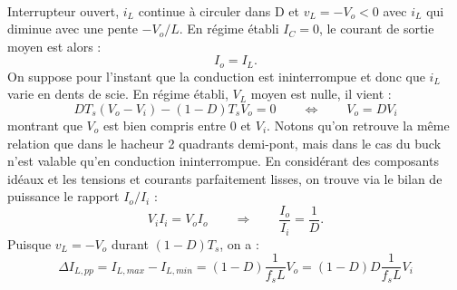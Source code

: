 		\ \\Interrupteur ouvert, $i_L$ continue à circuler dans D et $v_L = -V_o<0$ avec $i_L$  qui diminue avec une pente $-V_o/L$. En régime établi $I_C = 0$, le courant de sortie moyen est alors : 
		\begin{equation}
			I_o = I_L.
		\end{equation}
		On suppose pour l'instant que la conduction est ininterrompue et donc que $i_L$ varie en dents de scie. En régime établi, $V_L$ moyen est nulle, il vient :
		\begin{equation}
			DT_s(V_o-V_i) - (1-D)T_sV_o = 0 \qquad \Leftrightarrow \qquad V_o = DV_i
			\label{eq:5.2}
		\end{equation}
		montrant que $V_o$ est bien compris entre 0 et $V_i$. Notons qu'on retrouve la même relation que dans le hacheur 2 quadrants demi-pont, mais dans le cas du buck n'est valable qu'en conduction ininterrompue. En considérant des composants idéaux et les tensions et courants parfaitement lisses, on trouve via le bilan de puissance le rapport $I_o/I_i$ :
		\begin{equation}
			V_iI_i = V_oI_o \qquad \Rightarrow \qquad \frac{I_o}{I_i}=\frac{1}{D}.
		\end{equation}		 
		Puisque $v_L=  -V_o$ durant $(1-D)T_s$, on a :
		\begin{equation}
			\Delta I_{L,pp} = I_{L,max}-I_{L,min} = (1-D)\frac{1}{f_sL}V_o = (1-D)D\frac{1}{f_sL}V_i
			\label{eq:5.4}
		\end{equation}
		
